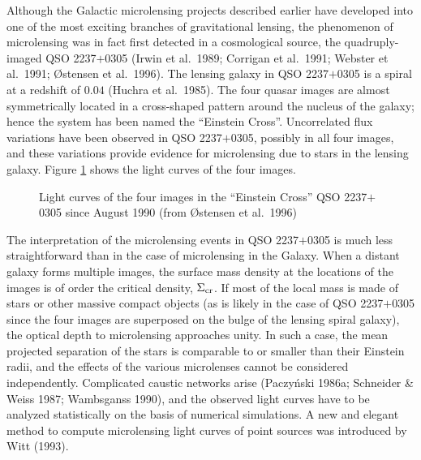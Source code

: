 \documentclass[a4paper,10pt]{article} %
\begin{document}
Although the Galactic microlensing projects described earlier have
developed into one of the most exciting branches of gravitational
lensing, the phenomenon of microlensing was in fact first detected in
a cosmological source, the quadruply-imaged QSO 2237$+$0305 (Irwin et
al.\ 1989; Corrigan et al.\ 1991; Webster et al.\ 1991; {\O}stensen et
al.\ 1996). The lensing galaxy in QSO 2237$+$0305 is a spiral at a
redshift of $0.04$ (Huchra et al.\ 1985). The four quasar images are
almost symmetrically located in a cross-shaped pattern around the
nucleus of the galaxy; hence the system has been named the ``Einstein
Cross''. Uncorrelated flux variations have been observed in QSO
2237$+$0305, possibly in all four images, and these variations provide
evidence for microlensing due to stars in the lensing galaxy. Figure
\ref{NB:fig2.11} shows the light curves of the four images.

\begin{figure}[ht] %
\begin{center}
\begin{minipage}[t]{0.6\hsize}
\end{minipage}
\end{center}
\caption{Light curves of the four images in the ``Einstein Cross'' QSO
  2237$+$0305 since August 1990 (from {\O}stensen et al.\ 1996)}
\label{NB:fig2.11}
\end{figure}

The interpretation of the microlensing events in QSO 2237$+$0305 is
much less straightforward than in the case of microlensing in the
Galaxy. When a distant galaxy forms multiple images, the surface mass
density at the locations of the images is of order the critical
density, $\Sigma_{\rm cr}$. If most of the local mass is made of stars
or other massive compact objects (as is likely in the case of QSO
2237$+$0305 since the four images are superposed on the bulge of the
lensing spiral galaxy), the optical depth to microlensing approaches
unity. In such a case, the mean projected separation of the stars is
comparable to or smaller than their Einstein radii, and the effects of
the various microlenses cannot be considered
independently. Complicated caustic networks arise (Paczy\'nski 1986a;
Schneider \& Weiss 1987; Wambsganss 1990), and the observed light
curves have to be analyzed statistically on the basis of numerical
simulations. A new and elegant method to compute microlensing light
curves of point sources was introduced by Witt (1993).
\end{document}
